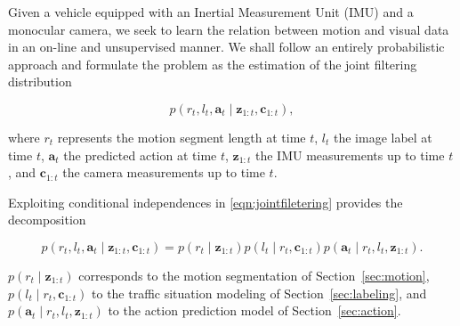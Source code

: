 Given a vehicle equipped with an Inertial Measurement Unit (IMU) and a monocular
camera, we seek to learn the relation between motion and visual data in an
on-line and unsupervised manner. We shall follow an entirely probabilistic
approach and formulate the problem as the estimation of the joint filtering
distribution

\begin{equation}
\label{eqn:jointfiletering}
p(r_t,l_t,\mathbf{a}_t\mid\mathbf{z}_{1:t},\mathbf{c}_{1:t}),
\end{equation}

where $r_t$ represents the motion segment length at time $t$, $l_t$ the image
label at time $t$, $\mathbf{a}_t$ the predicted action at time $t$,
$\mathbf{z}_{1:t}$ the IMU measurements up to time $t$, and $\mathbf{c}_{1:t}$
the camera measurements up to time $t$.

Exploiting conditional independences in \eqref{eqn:jointfiletering} provides the
decomposition

\begin{equation}
\label{eqn:jointdecomposition}
p(r_t,l_t,\mathbf{a}_t\mid\mathbf{z}_{1:t},\mathbf{c}_{1:t})=
p(r_t\mid\mathbf{z}_{1:t})p(l_t\mid r_t,\mathbf{c}_{1:t})
p(\mathbf{a}_t\mid r_t,l_t,\mathbf{z}_{1:t}).
\end{equation}

$p(r_t\mid\mathbf{z}_{1:t})$ corresponds to the motion segmentation of
Section~\ref{sec:motion}, $p(l_t\mid r_t,\mathbf{c}_{1:t})$ to the traffic
situation modeling of Section~\ref{sec:labeling}, and $p(\mathbf{a}_t\mid
r_t,l_t,\mathbf{z}_{1:t})$ to the action prediction model of
Section~\ref{sec:action}.
